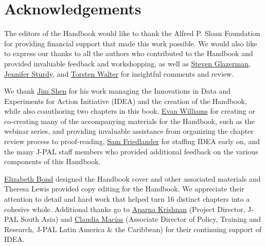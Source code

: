 \newpage\hypertarget{handbook_acknowledgements}{%
\section*{Acknowledgements}\label{handbook_acknowledgements}}

The editors of the Handbook would like to thank the Alfred P. Sloan Foundation for providing financial support that made this work possible. We would also like to express our thanks to all the authors who contributed to the Handbook and provided invaluable feedback and workshopping, as well as \href{https://www.poverty-action.org/people/steven-glazerman}{Steven Glazerman}, \href{https://www.bitss.org/people/jennifer-sturdy/}{Jennifer Sturdy}, and \href{https://nyuad.nyu.edu/en/academics/divisions/social-science/faculty/torsten-bernd-norbert-figueiredo-walter.html}{Torsten Walter} for insightful comments and review.

We thank \href{https://www.povertyactionlab.org/person/shen}{Jim Shen} for his work managing the Innovations in Data and Experiments for Action Initiative (IDEA) and the creation of the Handbook, while also coauthoring two chapters in this book, \href{https://www.povertyactionlab.org/person/williams}{Evan Williams} for creating or co-creating many of the accompanying materials for the Handbook, such as the webinar series, and providing invaluable assistance from organizing the chapter review process to proof-reading, \href{https://www.povertyactionlab.org/person/friedlander}{Sam Friedlander} for staffing IDEA early on, and the many J-PAL staff members who provided additional feedback on the various components of this Handbook.

\href{https://www.povertyactionlab.org/person/bond}{Elizabeth Bond} designed the Handbook cover and other associated materials and Theresa Lewis provided copy editing for the Handbook. We appreciate their attention to detail and hard work that helped turn 16 distinct chapters into a cohesive whole. Additional thanks go to \href{https://www.povertyactionlab.org/person/krishnan}{Aparna Krishnan} (Project Director, J-PAL South Asia) and \href{https://www.povertyactionlab.org/person/macias}{Claudia Macías} (Associate Director of Policy, Training and Research, J-PAL Latin America \& the Caribbean) for their continuing support of IDEA.


